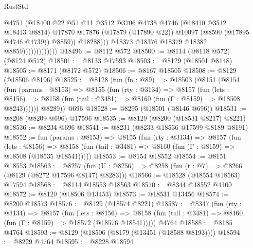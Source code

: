 \begin{lexlean}{RustStd}
\begin{coremodule}
                                      @4751
                                      (@18400
                                        @22
                                        @51
                                        @11
                                        @3512
                                        @3706
                                        @4738
                                        @4746
                                        (@18410 @3512 @18413 @8814)
                                        @17870
                                        @17876
                                        (@17879 (@17890 @22))
                                        @10097
                                        (@8590 (@17895 @4746 @4739))
                                        @8859))
                                    @18288)))
                              @18373
                              @18376
                              @18379
                              @18382
                              @8859)))))))))))))
@18496 := @8112 @572
@18500 := @8114 (@8118 @572) (@8124 @572)
@18501 := @8133 @17593
@18503 := @8129 (@18501 @8148)
@18505 := @8171 (@8172 @572)
@18506 := @8167 @18505
@18508 := @8129 (@18506 @8196)
@18525 := @8128
    (fun (fn : @89) =>
    @18503
      (@8151
        (@8154
          (fun (params : @8153) =>
          @8155
            (fun (rty : @3134) =>
            @8157
              (fun (lets : @8156) =>
              @8158 (fun (tail : @3481) => @8160 (fun (Γ : @8159) => @18508 @8243))))))
        @8289))
    @696
@18528 := @8295 (@18501 (@8146 @696))
@18531 := @8208 (@8209 @696) @17596
@18535 := @8129 (@8200 (@18531 @8217) @8221)
@18536 := @8234 @696
@18541 := @8231 (@8233 @18536 @17599 @8189 @8191)
@18552 := fun (params : @8153) =>
  @8155
    (fun (rty : @3134) =>
    @8157
      (fun (lets : @8156) =>
      @8158 (fun (tail : @3481) => @8160 (fun (Γ : @8159) => @18508 (@18535 @18541)))))
@18553 := @8154 @18552
@18554 := @8151 @18553
@18563 := @8257
    (fun (U : @8256) => @8258 (fun (t : @7) => @8266 (@8129 (@8272 @17596 @8147) @8283)))
@18566 := @18528 (@18554 @18563) @17594
@18568 := @8114 @18553 @18563
@18570 := @8344 @18552 @4100
@18572 := @8129 (@18506 @13453)
@18573 := @18531 @13456
@18574 := @8200 @18573
@18576 := @8129 (@18574 @8221)
@18587 := @8347
    (fun (rty : @3134) =>
    @8157
      (fun (lets : @8156) =>
      @8158 (fun (tail : @3481) => @8160 (fun (Γ : @8159) => @18572 (@18576 @18541)))))
    @4764
@18588 := @8185 @4764
@18593 := @8129 (@18506 (@8179 (@13451 (@18588 @8193))))
@18594 := @8229 @4764
@18595 := @8228 @18594

\end{coremodule}
\end{lexlean}
